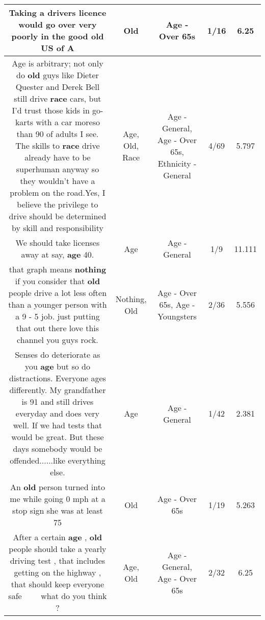 \documentclass[11pt]{article}
\newlength\mylength
\begin{document}
\begin{center}
\begin{longtable}{|C{.65\mylength}|C{.30\mylength}|C{.12\mylength}|C{.12\mylength}|C{.12\mylength}|}
  \small Taking a drivers licence would go over very poorly in the good \textbf{old} US of A\normalsize   & Old & Age - Over 65s & 1/16 & 6.25 \\  \hline
  \small Age is arbitrary; not only do \textbf{old} guys like Dieter Quester and Derek Bell still drive \textbf{race} cars, but I'd trust those kids in go-karts with a car moreso than 90 of adults I see. The skills to \textbf{race} drive already have to be superhuman anyway so they wouldn't have a problem on the road.Yes, I believe the privilege to drive should be determined by skill and responsibility\normalsize   & Age, Old, Race & Age - General, Age - Over 65s, Ethnicity - General & 4/69 & 5.797 \\  \hline
  \small We should take licenses away at say, \textbf{age} 40.\normalsize   & Age & Age - General & 1/9 & 11.111 \\  \hline
  \small that graph means \textbf{nothing} if you consider that \textbf{old} people drive a lot less often than a younger person with a 9 - 5 job.  just putting that out there love this channel you guys rock.\normalsize   & Nothing, Old & Age - Over 65s, Age - Youngsters & 2/36 & 5.556 \\  \hline
  \small Senses do deteriorate as you \textbf{age} but so do distractions. Everyone ages differently. My grandfather is 91 and still drives everyday and does very well. If we had tests that would be great. But these days somebody would be offended......like everything else.\normalsize   & Age & Age - General & 1/42 & 2.381 \\  \hline
  \small An \textbf{old} person turned into me while going 0 mph at a stop sign she was at least 75\normalsize   & Old & Age - Over 65s & 1/19 & 5.263 \\  \hline
  \small After a certain \textbf{age} , \textbf{old} people should take a yearly driving test , that includes getting on the highway , that should keep everyone safe 🤷🏻‍♀️🤷🏻‍♀️ what do you think ?\normalsize   & Age, Old & Age - General, Age - Over 65s & 2/32 & 6.25 \\  \hline

\end{longtable}
\end{center}
\end{document}
